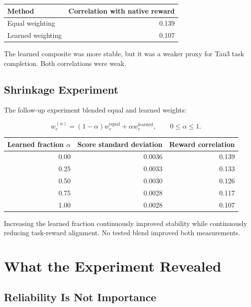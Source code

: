 \documentclass[11pt]{article}
\begin{document}
\begin{center}
\begin{tabular}{lr}
\toprule
Method & Correlation with native reward \\
\midrule
Equal weighting & 0.139 \\
Learned weighting & 0.107 \\
\bottomrule
\end{tabular}
\end{center}

The learned composite was more stable, but it was a weaker proxy for Tau3
task completion. Both correlations were weak.

\subsection{Shrinkage Experiment}

The follow-up experiment blended equal and learned weights:

\begin{equation}
w_e^{(\alpha)}
=
(1-\alpha)w_e^{\mathrm{equal}}
+ \alpha w_e^{\mathrm{learned}},
\qquad 0 \leq \alpha \leq 1.
\end{equation}

\begin{center}
\begin{tabular}{rrr}
\toprule
Learned fraction \(\alpha\) & Score standard deviation
& Reward correlation \\
\midrule
0.00 & 0.0036 & 0.139 \\
0.25 & 0.0033 & 0.133 \\
0.50 & 0.0030 & 0.126 \\
0.75 & 0.0028 & 0.117 \\
1.00 & 0.0028 & 0.107 \\
\bottomrule
\end{tabular}
\end{center}

Increasing the learned fraction continuously improved stability while
continuously reducing task-reward alignment. No tested blend improved both
measurements.

\section{What the Experiment Revealed}

\subsection{Reliability Is Not Importance}
\end{document}
